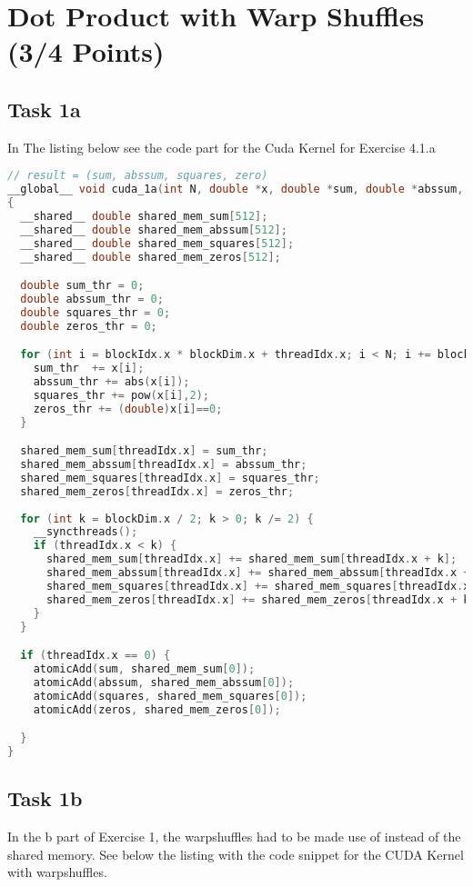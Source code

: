 \section{Dot Product with Warp Shuffles (3/4 Points)}

\subsection{Task 1a}

In The listing below see the code part for the Cuda Kernel for Exercise 4.1.a

\begin{lstlisting}[language=C++, title=C++ Cuda Code for 1a Kernel]
// result = (sum, abssum, squares, zero)
__global__ void cuda_1a(int N, double *x, double *sum, double *abssum, double *squares, double *zeros)
{
  __shared__ double shared_mem_sum[512];
  __shared__ double shared_mem_abssum[512];
  __shared__ double shared_mem_squares[512];
  __shared__ double shared_mem_zeros[512];

  double sum_thr = 0;
  double abssum_thr = 0;
  double squares_thr = 0;
  double zeros_thr = 0;

  for (int i = blockIdx.x * blockDim.x + threadIdx.x; i < N; i += blockDim.x * gridDim.x) {
    sum_thr  += x[i];
    abssum_thr += abs(x[i]);
    squares_thr += pow(x[i],2);
    zeros_thr += (double)x[i]==0;
  }

  shared_mem_sum[threadIdx.x] = sum_thr;
  shared_mem_abssum[threadIdx.x] = abssum_thr;
  shared_mem_squares[threadIdx.x] = squares_thr;
  shared_mem_zeros[threadIdx.x] = zeros_thr;
  
  for (int k = blockDim.x / 2; k > 0; k /= 2) {
    __syncthreads();
    if (threadIdx.x < k) {
      shared_mem_sum[threadIdx.x] += shared_mem_sum[threadIdx.x + k];
      shared_mem_abssum[threadIdx.x] += shared_mem_abssum[threadIdx.x + k];
      shared_mem_squares[threadIdx.x] += shared_mem_squares[threadIdx.x + k];
      shared_mem_zeros[threadIdx.x] += shared_mem_zeros[threadIdx.x + k];
    }
  }

  if (threadIdx.x == 0) {
    atomicAdd(sum, shared_mem_sum[0]);
    atomicAdd(abssum, shared_mem_abssum[0]);
    atomicAdd(squares, shared_mem_squares[0]);
    atomicAdd(zeros, shared_mem_zeros[0]);

  }
}
\end{lstlisting}

\pagebreak

\subsection{Task 1b}
In the b part of Exercise 1, the warpshuffles had to be made use of instead of the shared memory. See below the listing with the code snippet
for the CUDA Kernel with warpshuffles.


